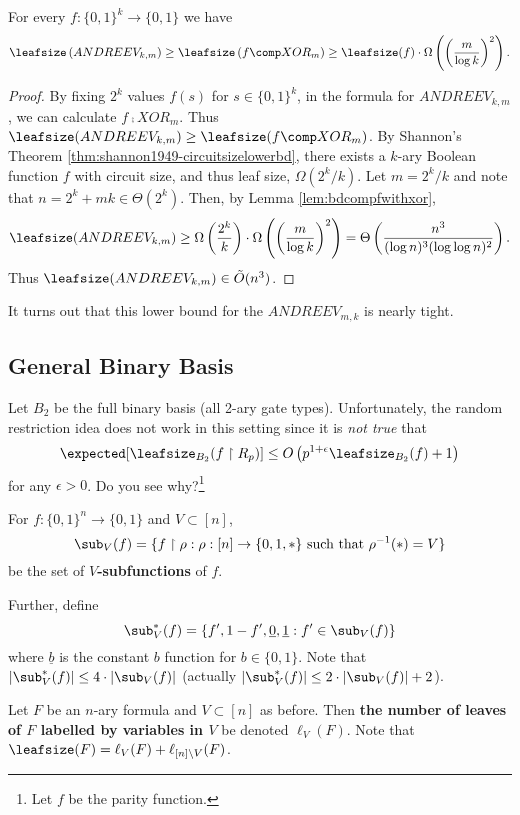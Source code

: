 \begin{theorem}
	\label{thm:L-DmFormulaCubicExplicit-Andreev}
	For every $f: \{0,1\}^k \rightarrow \{0,1\}$ we have
	\[\leafsize\left(ANDREEV_{k,m}\right)\geq \leafsize\left(f\comp XOR_m\right) \geq \leafsize(f)\cdot\Omega\left(\left(\frac{m}{\log k}\right)^2\right).\]
\end{theorem}
\begin{proof}
	By fixing $2^k$ values $f(s)$ for $s \in \{0,1\}^k$, in the formula for $ANDREEV_{k,m}$, we can calculate $f \comp XOR_m$. Thus $\leafsize(ANDREEV_{k,m}) \geq \leafsize(f \comp XOR_m)$. By Shannon's Theorem \ref{thm:shannon1949-circuitsizelowerbd}, there exists a $k$-ary Boolean function $f$ with circuit size, and thus leaf size, $\Omega(2^k/k)$. Let $m = 2^k/k$ and note that $n = 2^k + mk \in \Theta(2^k)$. Then, by Lemma \ref{lem:bdcompfwithxor},
	\[\leafsize(ANDREEV_{k,m}) \geq \Omega\left(\frac{2^k}{k}\right) \cdot \Omega\left(\left(\frac{m}{\log k}\right)^2\right) = \Theta\left(\frac{n^3}{(\log n)^3(\log \log n)^2}\right).\]
	Thus $\leafsize(ANDREEV_{k,m}) \in \tilde{O}(n^3)$.
\end{proof}
It turns out that this lower bound for the $ANDREEV_{m,k}$ is nearly tight. 

\subsection{General Binary Basis}
Let $B_2$ be the full binary basis (all 2-ary gate types). Unfortunately, the random restriction idea does not work in this setting since it is \emph{not true} that
\[\expected[\leafsize_{B_2}(f \upharpoonright R_p)] \leq O\left(p^{1 + \epsilon}\leafsize_{B_2}(f) + 1\right)\]
for any $\epsilon > 0$. Do you see why?\footnote{Let $f$ be the parity function.} 

\begin{definition}
	\label{def:NOTE-Vsubfunctions}
	For $f: \{0,1\}^n \rightarrow \{0,1\}$ and $V \subset [n]$, 
	\[\sub_V(f) = \{f\upharpoonright \rho: \rho:[n] \rightarrow \{0,1,*\} \mbox{ such that } \rho^{-1}(*) = V\}\] 
	be the set of \textbf{$V$-subfunctions} of $f$.
	
	Further, define 
	\[\sub_{V}^{*}(f) = \{f', 1 - f', \underline{0}, \underline{1}: f' \in \sub_V(f)\}\] where $\underline{b}$ is the constant $b$ function for $b \in \{0,1\}$. Note that $|\sub_{V}^{*}(f)| \leq 4\cdot|\sub_{V}(f)|$ (actually $|\sub_{V}^{*}(f)| \leq 2\cdot|\sub_{V}(f)| + 2$). 
	
	Let $F$ be an $n$-ary formula and $V \subset [n]$ as before. Then \textbf{the number of leaves of $F$ labelled by variables in $V$} be denoted $\ell_{V}(F)$. Note that $\leafsize(F) = \ell_V(F) + \ell_{[n]\backslash V}(F)$.
\end{definition}

